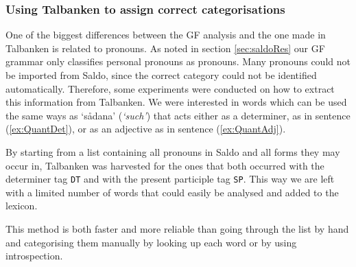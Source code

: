 \documentclass{report}
\begin{document}
\subsubsection{Using Talbanken to assign correct categorisations}
\label{sec:gf.quant}
One of the biggest differences between the GF analysis and the one made in Talbanken
is related to pronouns. 
As noted in section \ref{sec:saldoRes} our GF grammar only classifies personal pronouns
as pronouns. Many pronouns could not be imported from Saldo, since the correct category
could not be identified automatically. Therefore, some experiments were
conducted on how to extract this 
information from Talbanken. We were interested in words which can be used
the same ways as `sådana' (\emph{`such'}) that acts either as a
determiner, as in sentence (\ref{ex:QuantDet}), or as an adjective as
 in sentence (\ref{ex:QuantAdj}). 

By starting from a list containing all pronouns in Saldo and all forms they may occur in,
Talbanken was harvested for the ones that both occurred with the determiner tag \verb-DT-
and with the present participle tag \verb-SP-. This way we are left with a limited number
of words that could easily be analysed and added to the lexicon.

This method is
both faster and more reliable than going through the list by hand and categorising them
manually by looking up each word or by using introspection.


\end{document}
